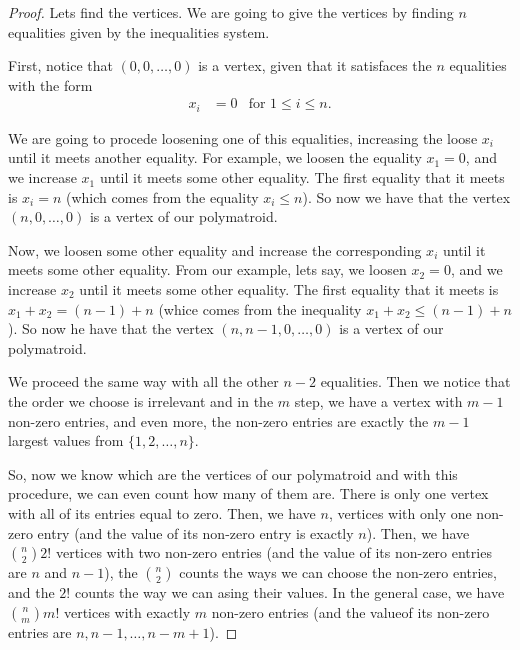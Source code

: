     \begin{proof}
        Lets find the vertices. We are going to give the vertices by finding $n$ equalities given by the inequalities system.\pn
        
        First, notice that $(0, 0, \dots, 0)$ is a vertex, given that it satisfaces the $n$ equalities with the form 
        \begin{align}
                x_i     &= 0                                &\text{for $1 \leq i \leq n$}.
        \end{align}
        
        We are going to procede loosening one of this equalities, increasing the loose $x_i$ until it meets another equality. For example,
        we loosen the equality $x_1 = 0$, and we increase $x_1$ until it meets some other equality. The first equality that it meets is
        $x_i = n$ (which comes from the equality $x_i \leq n$). So now we have that the vertex $(n, 0, \dots, 0)$ is a vertex of our
        polymatroid.\pn
        
        Now, we loosen some other equality and increase the corresponding $x_i$ until it meets some other equality. From our example, lets say, 
        we loosen $x_2 = 0$, and we increase $x_2$ until it meets some other equality. The first equality that it meets is $x_1 + x_2 = (n-1) + n$
        (whice comes from the inequality $x_1 + x_2 \leq (n-1) + n$). So now he have that the vertex $(n, n-1, 0, \dots, 0)$ is a vertex of our
        polymatroid.\pn
        
        We proceed the same way with all the other $n-2$ equalities. Then we notice that the order we choose is irrelevant and in the $m$ step, we
        have a vertex with $m-1$ non-zero entries, and even more, the non-zero entries are exactly the $m-1$ largest values from $\{1, 2, \dots, n\}$.\pn
        
        So, now we know which are the vertices of our polymatroid and with this procedure, we can even count how many of them are.
        There is only one vertex with all of its entries equal to zero. Then, we have $n$, vertices with only one non-zero entry (and the value of its non-zero
        entry is exactly $n$). Then, we have $\binom{n}{2} 2!$ vertices with two non-zero entries (and the value of its non-zero entries are $n$ and $n-1$), 
        the $\binom{n}{2}$ counts the ways we can choose the non-zero entries, and the $2!$ counts the way we can asing their values. In the general case,
        we have $\binom{n}{m} m!$ vertices with exactly $m$ non-zero entries (and the valueof its non-zero entries are $n, n-1, \dots, n-m+1$).\pn
        

\end{proof}
